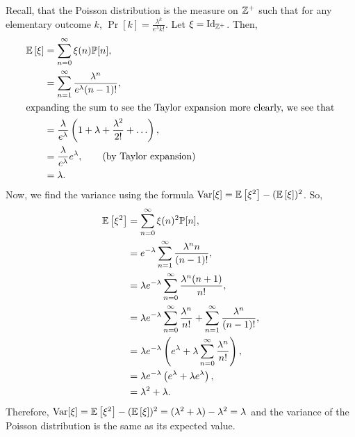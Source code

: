 \begin{solution}
    Recall, that the Poisson distribution is the measure on $\mathbb{Z}^+$ such that for
    any elementary outcome $k$, $\Pr\left[{k}\right] =
    \frac{\lambda^k}{e^\lambda k!}$. Let $\xi = \operatorname{Id}_{\mathbb{Z}^+}$. Then, 
    \begin{align*}
        \mathbb{E}\left[\xi\right] &= \sum_{n=0}^\infty \xi(n)\mathbb{P}[{n}], \\
        &= \sum_{n=1}^\infty \frac{\lambda^n}{e^\lambda (n-1)!}, \\
        \intertext{expanding the sum to see the Taylor expansion more clearly, we see that}
        &= \frac{\lambda}{e^\lambda}\left(1 + \lambda + \frac{\lambda^2}{2!} + \ldots \right), \\
        &= \frac{\lambda}{e^\lambda}e^\lambda, \tag{by Taylor expansion} \\
        &= \lambda.
    \end{align*}
    Now, we find the variance using the formula $\operatorname{Var}[\xi] = \mathbb{E}\left[\xi^2\right] - (\mathbb{E}\left[\xi\right])^2$. So,
    \begin{align*}
        \mathbb{E}\left[\xi^2\right] &= \sum_{n=0}^\infty \xi(n)^2\mathbb{P}[n], \\
        &= e^{-\lambda}\sum_{n=1}^\infty \frac{\lambda^n n}{(n-1)!}, \\
        &= \lambda e^{-\lambda} \sum_{n=0}^\infty \frac{\lambda^n (n+1)}{n!}, \\
        &= \lambda e^{-\lambda} \sum_{n=0}^\infty \frac{\lambda^n}{n!} + \sum_{n=1}^\infty \frac{\lambda^n}{(n-1)!}, \\
        &= \lambda e^{-\lambda} \left(e^\lambda + \lambda \sum_{n=0}^\infty \frac{\lambda^n}{n!}\right), \\
        &= \lambda e^{-\lambda} \left(e^\lambda + \lambda e^\lambda\right), \\
        &= \lambda^2 + \lambda.
    \end{align*}
    Therefore, $\operatorname{Var}[\xi] = \mathbb{E}\left[\xi^2\right] - (\mathbb{E}\left[\xi\right])^2 = (\lambda^2 + \lambda) - \lambda^2 = \lambda$ and the variance of the Poisson distribution is the same as its expected value.
\end{solution}
\begin{problem}{9}
\end{problem}
